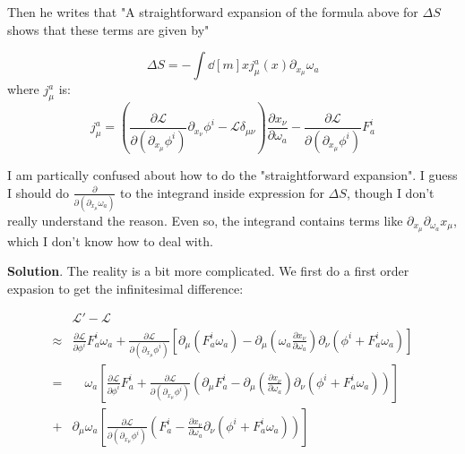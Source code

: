 \documentclass{article}
\begin{document}
Then he writes that "A straightforward expansion of the formula above
for $\Delta S$ shows that these terms are given by"

\begin{equation}
    \Delta S = -\int \dd[m]{x} j^a_\mu (x) \partial_{x_\mu}\omega_a
\end{equation}
where $j^a_\mu$ is:
\begin{equation}
    j^a_\mu = \left(
        \frac{\partial \mathcal{L}}{\partial(\partial_{x_\mu}\phi^i)}
            \partial_{x_\nu}\phi^i
        -\mathcal{L}\delta_{\mu\nu} \right) \frac{\partial x_\nu}{\partial\omega_a}
    - \frac{\partial\mathcal{L}}{\partial(\partial_{x_\mu}\phi^i)} F^i_a
\end{equation}

I am partically confused about how to do the "straightforward expansion". I
guess I should do $\frac{\partial}{\partial (\partial_{x_\mu}\omega_a)}$ to the
integrand inside expression for $\Delta S$, though I don't really understand the
reason. Even so, the integrand contains terms like
$\partial_{x_\mu}\partial_{\omega_a}x_\mu$, which I don't know how to deal with.

\textbf{Solution}. The reality is a bit more complicated. We first do a first
order expasion to get the infinitesimal difference:

\begin{align}
    &\mathcal{L}'-\mathcal{L} \\
    \approx &
    \frac{\partial \mathcal{L}}{\partial\phi^i} F^i_a\omega_a
    +\frac{\partial \mathcal{L}}{\partial(\partial_{x_\mu}\phi^i)}
        \left[
        \partial_\mu\left(F^i_a\omega_a\right) 
            - \partial_\mu\left(\omega_a\frac{\partial x_\nu}{\partial\omega_a}\right)
                \partial_\nu\left(\phi^i+F^i_a\omega_a\right)
        \right]
    \nonumber\\
    =&\quad
    \omega_a
    \left[
        \frac{\partial \mathcal{L}}{\partial\phi^i}F^i_a 
        +
        \frac{\partial \mathcal{L}}{\partial(\partial_{x_\mu}\phi^i)}
        \left(
            \partial_\mu F^i_a 
            - \partial_\mu(\frac{\partial x_\nu}{\partial \omega_a})
            \partial_\nu(\phi^i+F^i_a\omega_a)
        \right)
    \right]
    \label{eq:l-l-omega}
    \\
    +&
    \partial_\mu\omega_a
    \left[
        \frac{\partial \mathcal{L}}{\partial(\partial_{x_\mu}\phi^i)}
        \left(
            F^i_a-\frac{\partial x_\nu}{\partial \omega_a}
            \partial_\nu(\phi^i+F^i_a\omega_a)
        \right)
    \right]
    \label{eq:l-l-pmu-omega}
\end{align}
\end{document}
